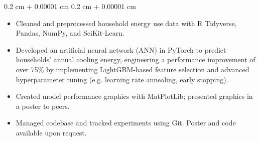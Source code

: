 \documentclass[10pt, letterpaper]{article}
\newenvironment{highlights}{
    \begin{itemize}[
        topsep=0.10 cm,
        parsep=0.10 cm,
        partopsep=0pt,
        itemsep=0pt,
        leftmargin=0.4 cm + 10pt
    ]
}{
    \end{itemize}
} %
\newenvironment{onecolentry}{
    \begin{adjustwidth}{
        0.2 cm + 0.00001 cm
    }{
        0.2 cm + 0.00001 cm
    }
}{
    \end{adjustwidth}
} %
\newenvironment{twocolentry}[2][]{
    \onecolentry
    \def\secondColumn{#2}
    \setcolumnwidth{\fill, 4.5 cm}
    \begin{paracol}{2}
}{
    \switchcolumn \raggedleft \secondColumn
    \end{paracol}
    \endonecolentry
} %
\begin{document}
        \vspace{0.10 cm}
        \begin{onecolentry}
            \begin{highlights}
                \item Cleaned and preprocessed household energy use data with R Tidyverse, Pandas, NumPy, and SciKit-Learn.
                \item Developed an artificial neural network (ANN) in PyTorch to predict households' annual cooling energy, engineering a performance improvement of over 75\% by implementing LightGBM-based feature selection and advanced hyperparameter tuning (e.g. learning rate annealing, early stopping).
                \item Created model performance graphics with MatPlotLib; presented graphics in a poster to peers.
                \item Managed codebase and tracked experiments using Git. Poster and code available upon request.
            \end{highlights}
        \end{onecolentry}

        

\end{document}
